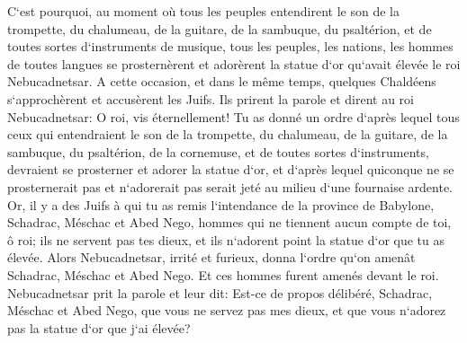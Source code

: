 \verse C`est pourquoi, au moment où tous les peuples entendirent le son de la trompette, du chalumeau, de la guitare, de la sambuque, du psaltérion, et de toutes sortes d`instruments de musique, tous les peuples, les nations, les hommes de toutes langues se prosternèrent et adorèrent la statue d`or qu`avait élevée le roi Nebucadnetsar. 
\verse A cette occasion, et dans le même temps, quelques Chaldéens s`approchèrent et accusèrent les Juifs. 
\verse Ils prirent la parole et dirent au roi Nebucadnetsar: O roi, vis éternellement! 
\verse Tu as donné un ordre d`après lequel tous ceux qui entendraient le son de la trompette, du chalumeau, de la guitare, de la sambuque, du psaltérion, de la cornemuse, et de toutes sortes d`instruments, devraient se prosterner et adorer la statue d`or, 
\verse et d`après lequel quiconque ne se prosternerait pas et n`adorerait pas serait jeté au milieu d`une fournaise ardente. 
\verse Or, il y a des Juifs à qui tu as remis l`intendance de la province de Babylone, Schadrac, Méschac et Abed Nego, hommes qui ne tiennent aucun compte de toi, ô roi; ils ne servent pas tes dieux, et ils n`adorent point la statue d`or que tu as élevée. 
\verse Alors Nebucadnetsar, irrité et furieux, donna l`ordre qu`on amenât Schadrac, Méschac et Abed Nego. Et ces hommes furent amenés devant le roi. 
\verse Nebucadnetsar prit la parole et leur dit: Est-ce de propos délibéré, Schadrac, Méschac et Abed Nego, que vous ne servez pas mes dieux, et que vous n`adorez pas la statue d`or que j`ai élevée? 
